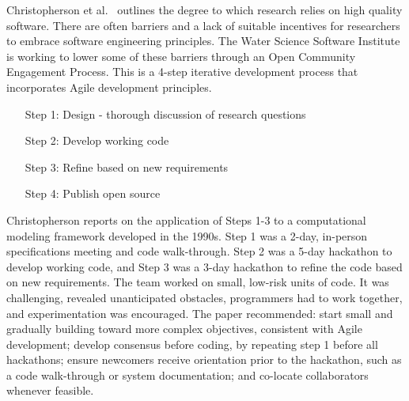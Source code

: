 \documentclass[11pt, oneside]{amsart}
\begin{document}


Christopherson et al.~\cite{Christopherson_WSSSPE} outlines the degree to which research relies on high
quality software. There are often barriers and a lack of suitable incentives
for researchers to embrace software engineering principles. The Water Science
Software Institute is working to lower some of these barriers through an Open
Community Engagement Process. This is a 4-step iterative development process
that incorporates Agile development principles.

\begin{itemize}
\setlength{\itemindent}{0.5in}
\item[Step 1:] Design - thorough discussion of research questions
\item[Step 2:] Develop working code
\item[Step 3:] Refine based on new requirements
\item[Step 4:] Publish open source
\end{itemize}

Christopherson reports on the application of Steps 1-3 to a computational
modeling framework developed in the 1990s. Step 1 was a 2-day, in-person
specifications meeting and code walk-through. Step 2 was a 5-day hackathon to
develop working code, and Step 3 was a 3-day hackathon to refine the code based
on new requirements. The team worked on small, low-risk units of code. It was
challenging, revealed unanticipated obstacles, programmers had to work
together, and experimentation was encouraged.
%
The paper recommended: start small and gradually building toward more complex
objectives, consistent with Agile development; develop consensus before coding,
by repeating step 1 before all hackathons; ensure newcomers receive orientation
prior to the hackathon, such as a code walk-through or system documentation;
and co-locate collaborators whenever feasible.

\end{document}
